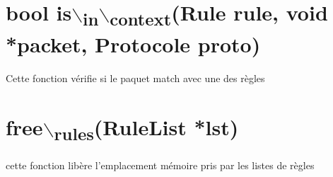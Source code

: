 \documentclass[a4paper]{report}
\begin{document}
\section{bool is$\backslash$\textsubscript{in}$\backslash$\textsubscript{context}(Rule rule, void *packet, Protocole proto)}
\label{sec:orgc39f7c2}
Cette fonction vérifie si le paquet match avec une des règles
\section{free$\backslash$\textsubscript{rules}(RuleList *lst)}
\label{sec:org8d082f9}
cette fonction libère l'emplacement mémoire pris par les listes de règles
\end{document}
